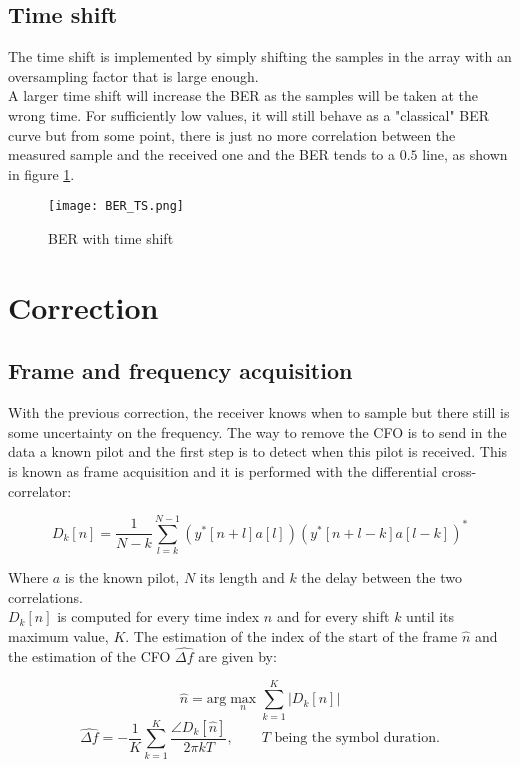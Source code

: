 \subsection{Time shift}
The time shift is implemented by simply shifting the samples in the array with an oversampling factor that is large enough. \\
A larger time shift will increase the BER as the samples will be taken at the wrong time. For sufficiently low values, it will still behave as a "classical" BER curve but from some point, there is just no more correlation between the measured sample and the received one and the BER tends to a $0.5$ line, as shown in figure \ref{fig:BER_TS}. \\

\begin{figure}[H]
    \centering
    \texttt{[image: BER\_TS.png]}
    \caption{BER with time shift}
    \label{fig:BER_TS}
\end{figure}

\section{Correction}

\subsection{Frame and frequency acquisition}

With the previous correction, the receiver knows when to sample but there still is some uncertainty on the frequency. The way to remove the CFO is to send in the data a known pilot and the first step is to detect when this pilot is received. This is known as frame acquisition and it is performed with the differential cross-correlator:

\begin{equation*}
    D_k[n] = \frac{1}{N-k} \sum_{l=k}^{N-1} \left(y^*[n+l]a[l]\right) \left(y^*[n+l-k]a[l-k]\right)^*
\end{equation*}

Where $a$ is the known pilot, $N$ its length and $k$ the delay between the two correlations. \\
$D_k[n]$ is computed for every time index $n$ and for every shift $k$ until its maximum value, $K$. The estimation of the index of the start of the frame $\hat{n}$ and the estimation of the CFO $\hat{\Delta f}$ are given by:

\begin{equation*}
    \hat{n} = \text{arg} \max_n \sum_{k=1}^{K} |D_k[n]|
\end{equation*}
\begin{equation*}
    \hat{\Delta f} = -\frac{1}{K} \sum_{k=1}^{K} \frac{\angle D_k[\hat{n}]}{2\pi kT}, \qquad T \text{ being the symbol duration.}
\end{equation*}

